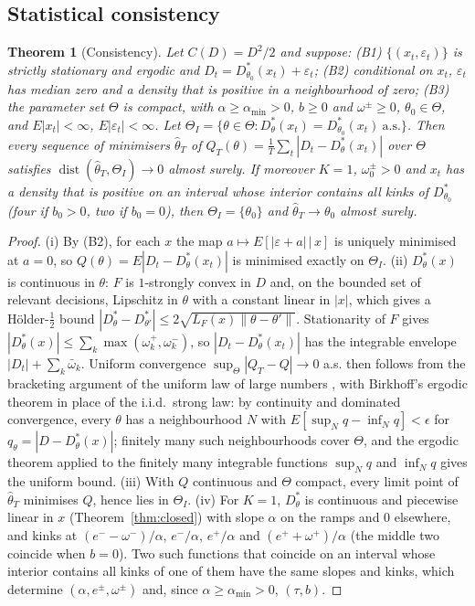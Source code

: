 \documentclass[11pt,a4paper]{article}
\newtheorem{theorem}{Theorem}
\theoremstyle{remark}\newtheorem{remark}{Remark}
\begin{document}
\subsection{Statistical consistency}\label{sec:consistency}
\begin{theorem}[Consistency]\label{thm:cons}
Let $C(D)=D^2/2$ and suppose: (B1) $\{(x_t,\varepsilon_t)\}$ is strictly stationary and ergodic and $D_t=D^*_{\theta_0}(x_t)+\varepsilon_t$; (B2) conditional on $x_t$, $\varepsilon_t$ has median zero and a density that is positive in a neighbourhood of zero; (B3) the parameter set $\Theta$ is compact, with $\alpha\ge\alpha_{\min}>0$, $b\ge0$ and $\omega^\pm\ge0$, $\theta_0\in\Theta$, and $E|x_t|<\infty$, $E|\varepsilon_t|<\infty$. Let $\Theta_I=\{\theta\in\Theta: D^*_\theta(x_t)=D^*_{\theta_0}(x_t)\ \text{a.s.}\}$. Then every sequence of minimisers $\hat\theta_T$ of $Q_T(\theta)=\frac1T\sum_t|D_t-D^*_\theta(x_t)|$ over $\Theta$ satisfies $\operatorname{dist}(\hat\theta_T,\Theta_I)\to0$ almost surely. If moreover $K=1$, $\omega_0^\pm>0$ and $x_t$ has a density that is positive on an interval whose interior contains all kinks of $D^*_{\theta_0}$ (four if $b_0>0$, two if $b_0=0$), then $\Theta_I=\{\theta_0\}$ and $\hat\theta_T\to\theta_0$ almost surely.
\end{theorem}
\begin{proof}
(i) By (B2), for each $x$ the map $a\mapsto E[|\varepsilon+a|\,|\,x]$ is uniquely minimised at $a=0$, so $Q(\theta)=E|D_t-D^*_\theta(x_t)|$ is minimised exactly on $\Theta_I$. (ii) $D^*_\theta(x)$ is continuous in $\theta$: $F$ is $1$-strongly convex in $D$ and, on the bounded set of relevant decisions, Lipschitz in $\theta$ with a constant linear in $|x|$, which gives a H\"older-$\tfrac12$ bound $|D^*_\theta-D^*_{\theta'}|\le2\sqrt{L_F(x)\|\theta-\theta'\|}$. Stationarity of $F$ gives $|D^*_\theta(x)|\le\sum_k\max(\omega_k^+,\omega_k^-)$, so $|D_t-D^*_\theta(x_t)|$ has the integrable envelope $|D_t|+\sum_k\bar\omega_k$. Uniform convergence $\sup_\Theta|Q_T-Q|\to0$ a.s. then follows from the bracketing argument of the uniform law of large numbers \citep[Lemma 2.4]{newey1994}, with Birkhoff's ergodic theorem in place of the i.i.d.\ strong law: by continuity and dominated convergence, every $\theta$ has a neighbourhood $N$ with $E[\sup_N q-\inf_N q]<\epsilon$ for $q_\theta=|D-D^*_\theta(x)|$; finitely many such neighbourhoods cover $\Theta$, and the ergodic theorem applied to the finitely many integrable functions $\sup_N q$ and $\inf_N q$ gives the uniform bound. (iii) With $Q$ continuous and $\Theta$ compact, every limit point of $\hat\theta_T$ minimises $Q$, hence lies in $\Theta_I$. (iv) For $K=1$, $D^*_\theta$ is continuous and piecewise linear in $x$ (Theorem~\ref{thm:closed}) with slope $\alpha$ on the ramps and $0$ elsewhere, and kinks at $(e^--\omega^-)/\alpha$, $e^-/\alpha$, $e^+/\alpha$ and $(e^++\omega^+)/\alpha$ (the middle two coincide when $b=0$). Two such functions that coincide on an interval whose interior contains all kinks of one of them have the same slopes and kinks, which determine $(\alpha,e^\pm,\omega^\pm)$ and, since $\alpha\ge\alpha_{\min}>0$, $(\tau,b)$.
\end{proof}
\end{document}
